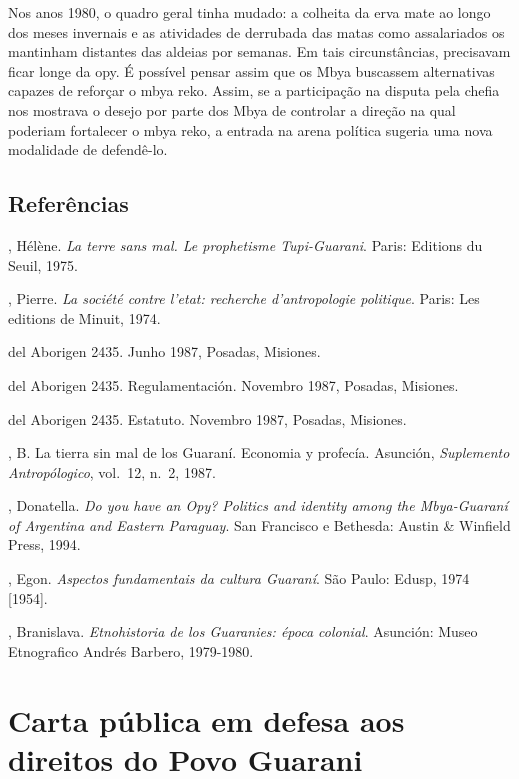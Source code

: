 Nos anos 1980, o quadro geral tinha mudado: a colheita da erva mate ao
longo dos meses invernais e as atividades de derrubada das matas como
assalariados os mantinham distantes das aldeias por semanas. Em tais
circunstâncias, precisavam ficar longe da opy. É possível pensar assim
que os Mbya buscassem alternativas capazes de reforçar o mbya reko.
Assim, se a participação na disputa pela chefia nos mostrava o desejo
por parte dos Mbya de controlar a direção na qual poderiam fortalecer o
mbya reko, a entrada na arena política sugeria uma nova modalidade de
defendê-lo. 

\section{Referências}

\begin{Parskip}
, Hélène. \emph{La terre sans mal. Le prophetisme Tupi-Guarani}. Paris:
Editions du Seuil, 1975.

, Pierre. \emph{La société contre l’etat: recherche d’antropologie
politique}. Paris: Les editions de Minuit, 1974.

 del Aborigen 2435. Junho 1987, Posadas, Misiones.

 del Aborigen 2435. Regulamentación. Novembro 1987, Posadas,
Misiones.

 del Aborigen 2435. Estatuto. Novembro 1987, Posadas, Misiones.

, B. La tierra sin mal de los Guaraní. Economia y profecía.
Asunción, \emph{Suplemento Antropólogico}, vol.~12, n.~2, 1987.

, Donatella. \emph{Do you have an Opy? Politics and identity among the
Mbya-Guaraní of Argentina and Eastern Paraguay}. San Francisco e
Bethesda: Austin \& Winfield Press, 1994.

, Egon. \emph{Aspectos fundamentais da cultura Guaraní}. São Paulo:
Edusp, 1974 [1954].

, Branislava. \emph{Etnohistoria de los Guaranies: época colonial}.
Asunción: Museo Etnografico Andrés Barbero, 1979-1980.
\end{Parskip}

\chapter{Carta pública em defesa aos direitos do Povo Guarani}

